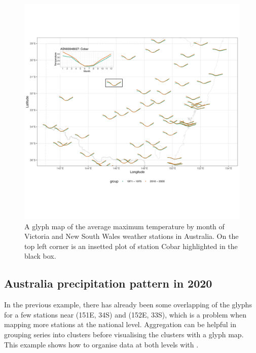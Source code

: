 \documentclass[
]{jss}
\begin{document}
\begin{CodeChunk}
\begin{figure}

{\centering \includegraphics[width=1\linewidth,height=0.7\textheight]{../figures/basic-manip} 

}

\caption[A glyph map of the average maximum temperature by month of Victoria and New South Wales weather stations in Australia]{A glyph map of the average maximum temperature by month of Victoria and New South Wales weather stations in Australia. On the top left corner is an insetted plot of station Cobar highlighted in the black box.}\label{fig:basic-manip}
\end{figure}
\end{CodeChunk}

\hypertarget{precip}{%
\subsection{Australia precipitation pattern in 2020}\label{precip}}

In the previous example, there has already been some overlapping of the glyphs for a few stations near (151E, 34S) and (152E, 33S), which is a problem when mapping more stations at the national level. Aggregation can be helpful in grouping series into clusters before visualising the clusters with a glyph map. This example shows how to organise data at both levels with .
\end{document}
